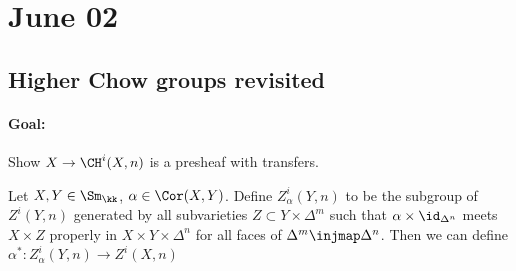 \section{June 02}



\subsection{Higher Chow groups revisited}

\paragraph{Goal:} Show $X \to \CH^i(X,n)$ is a presheaf with transfers.

\begin{definition}
  Let $X, Y \in \Sm_\kk$, $\alpha \in \Cor(X,Y)$.
  Define $Z^i_\alpha(Y,n)$ to be the subgroup of $Z^i(Y,n)$ generated by all subvarieties $Z \subset Y \times \Delta^m$ such that $\alpha \times \id_{\Delta^n}$ meets $X \times Z$ properly in $X \times Y \times \Delta^n$ for all faces of $\Delta^m \injmap \Delta^n$.
  Then we can define $\alpha^* \colon Z^i_\alpha(Y,n) \to Z^i(X,n)$ 
\end{definition}
